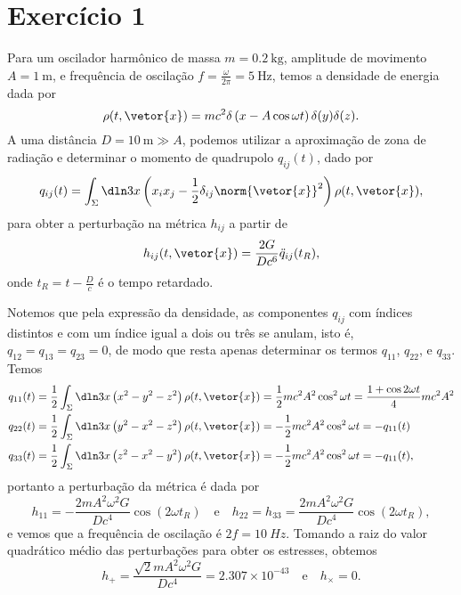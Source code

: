 \section*{Exercício 1}
Para um oscilador harmônico de massa \(m = \SI{0.2}{\kilogram}\), amplitude de movimento \(A = \SI{1}{\meter}\), e frequência de oscilação \(f = \frac{\omega}{2\pi} = \SI{5}{\hertz}\), temos a densidade de energia dada por
\begin{equation*}
    \rho(t, \vetor{x}) = mc^2 \delta\left(x - A \cos\omega t\right)\delta(y)\delta(z).
\end{equation*}
A uma distância \(D = \SI{10}{\meter} \gg A\), podemos utilizar a aproximação de zona de radiação e determinar o momento de quadrupolo \(q_{ij}(t)\), dado por
\begin{equation*}
    q_{ij}(t) = \int_{\Sigma} \dln3x \left(x_i x_j - \frac12 \delta_{ij} \norm{\vetor{x}}^2\right)\rho(t, \vetor{x}),
\end{equation*}
para obter a perturbação na métrica \(h_{ij}\) a partir de
\begin{equation*}
    h_{ij}(t, \vetor{x}) = \frac{2G}{Dc^6} \ddot{q}_{ij}(t_R),
\end{equation*}
onde \(t_R = t - \frac{D}{c}\) é o tempo retardado.

Notemos que pela expressão da densidade, as componentes \(q_{ij}\) com índices distintos e com um índice igual a dois ou três se anulam, isto é, \(q_{12} = q_{13} = q_{23} = 0\), de modo que resta apenas determinar os termos \(q_{11}\), \(q_{22}\), e \(q_{33}\). Temos
\begin{align*}
    q_{11}(t) &= \frac12 \int_{\Sigma} \dln3x \left(x^2 - y^2 - z^2\right) \rho(t, \vetor{x}) = \frac12 mc^2A^2 \cos^2\omega t = \frac{1 + \cos2\omega t}4 mc^2A^2\\
    q_{22}(t) &= \frac12 \int_{\Sigma} \dln3x \left(y^2-x^2  - z^2\right) \rho(t, \vetor{x})= -\frac12 mc^2A^2 \cos^2\omega t = -q_{11}(t)\\
    q_{33}(t) &= \frac12 \int_{\Sigma} \dln3x \left(z^2-x^2 - y^2\right) \rho(t, \vetor{x})= -\frac12 mc^2A^2\cos^2\omega t = -q_{11}(t),
\end{align*}
portanto a perturbação da métrica é dada por
\begin{equation*}
    h_{11} = -\frac{2mA^2\omega^2G}{Dc^4} \cos(2\omega t_R)\quad\text{e}\quad h_{22} = h_{33} = \frac{2mA^2\omega^2G}{Dc^4} \cos(2\omega t_R),
\end{equation*}
e vemos que a frequência de oscilação é \(2f = \SI{10}{Hz}\). Tomando a raiz do valor quadrático médio das perturbações para obter os estresses, obtemos
\begin{equation*}
    h_+ = \frac{\sqrt{2}mA^2\omega^2 G}{D c^4} = 2.307\times 10^{-43}\quad\text{e}\quad h_\times = 0.
\end{equation*}

